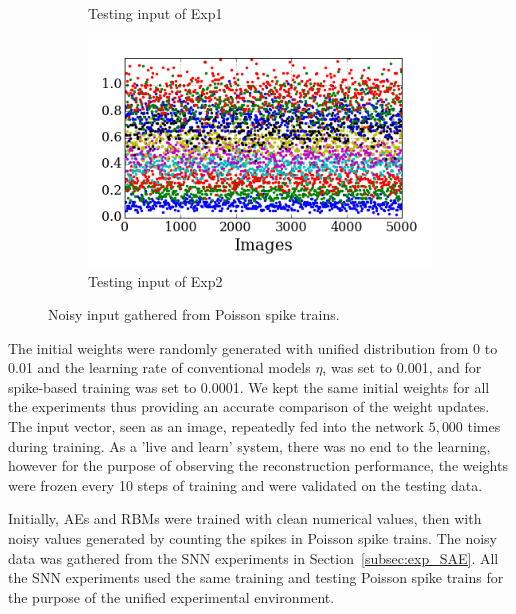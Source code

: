 \begin{figure}
\begin{subfigure}[t]{0.48\textwidth}
		\caption{Testing input of Exp1}
	\end{subfigure}
	\begin{subfigure}[t]{0.48\textwidth}
		\includegraphics[width=\textwidth]{pics_sdlm/21_exp_AE_noise/exp2.png}
		\caption{Testing input of Exp2}
	\end{subfigure}
	\caption{Noisy input gathered from Poisson spike trains.}
	\label{fig:noise_input}
\end{figure}

The initial weights were randomly generated with unified distribution from 0 to 0.01 and the learning rate of conventional models $\eta$, was set to 0.001, and for spike-based training was set to 0.0001.
We kept the same initial weights for all the experiments thus providing an accurate comparison of the weight updates.
The input vector, seen as an image, repeatedly fed into the network $5,000$ times during training.
As a 'live and learn' system, there was no end to the learning, however for the purpose of observing the reconstruction performance, the weights were frozen every 10 steps of training and were validated on the testing data. 

Initially, AEs and RBMs were trained with clean numerical values, then with noisy values generated by counting the spikes in Poisson spike trains.
The noisy data was gathered from the SNN experiments in Section~\ref{subsec:exp_SAE}.
All the SNN experiments used the same training and testing Poisson spike trains for the purpose of the unified experimental environment.

